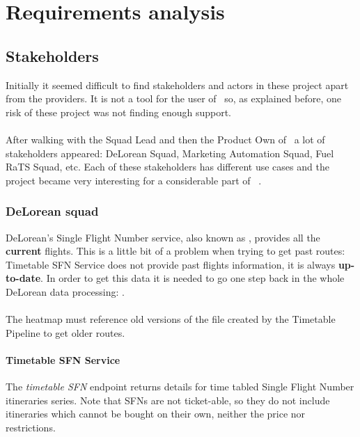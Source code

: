 
\chapter{Requirements analysis}

\label{chapter04}

\section{Stakeholders} \label{stakeholders}

Initially it seemed difficult to find stakeholders and actors in these project apart from the providers. It is not a tool for the user of \company\, so, as explained before, one risk of these project was not finding enough support.
\\\\
After walking with the Squad Lead and then the Product Own of \squad\ a lot of stakeholders appeared: DeLorean Squad, Marketing Automation Squad, Fuel RaTS Squad, etc. Each of these stakeholders has different use cases and the project became very interesting for a considerable part of \company\ .

\subsection{DeLorean squad} \label{dlr}

DeLorean's Single Flight Number service, also known as \textit{}, provides all the \textbf{current} flights. This is a little bit of a problem when trying to get past routes: Timetable SFN Service does not provide past flights information, it is always \textbf{up-to-date}. In order to get this data it is needed to go one step back in the whole DeLorean data processing: \textit{}.
\\\\
The heatmap must reference old versions of the file created by the Timetable Pipeline to get older routes.

\subsubsection*{Timetable SFN Service} \label{timetable_sfn_service}

The \textit{timetable SFN} endpoint returns details for time tabled Single Flight Number itineraries series. Note that SFNs are not ticket-able, so they do not include itineraries which cannot be bought on their own, neither the price nor restrictions.

